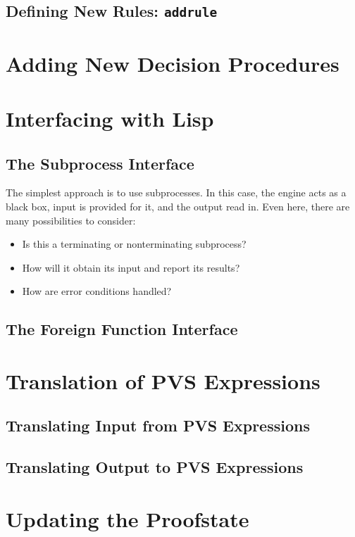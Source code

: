 \documentclass[12pt]{book}
\begin{document}
\subsection{Defining New Rules: \texttt{addrule}}

\section{Adding New Decision Procedures}

\section{Interfacing with Lisp}

\subsection{The Subprocess Interface}

The simplest approach is to use subprocesses.  In this case, the
engine acts as a black box, input is provided for it, and the output read
in.  Even here, there are many possibilities to consider:
\begin{itemize}
\item Is this a terminating or nonterminating subprocess?
\item How will it obtain its input and report its results?
\item How are error conditions handled?
\end{itemize}

\subsection{The Foreign Function Interface}

\section{Translation of PVS Expressions}

\subsection{Translating Input from PVS Expressions}

\subsection{Translating Output to PVS Expressions}

\section{Updating the Proofstate}
\end{document}
